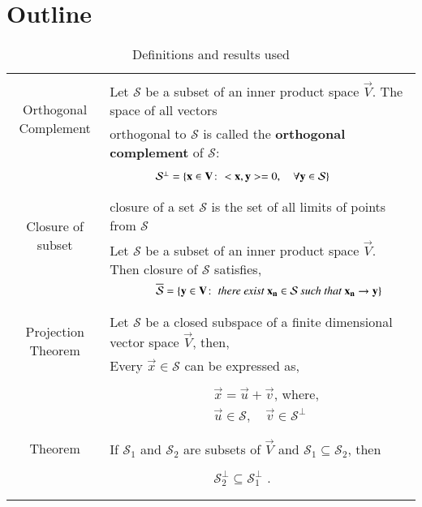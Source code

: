 \documentclass[journal,12pt]{IEEEtran}
\begin{document}
\section{\textbf{Outline}}
\renewcommand{\thetable}{1}
\begin{longtable}{|c|l|}
    \hline
	\multirow{3}{*}{Orthogonal Complement} 
	& \\
	& Let $\mathcal{S}$ be a subset of an inner product space $\vec{V}$. The space of all vectors\\
	&orthogonal to $\mathcal{S}$ is called the \textbf{orthogonal complement} of $\mathcal{S}$:\\
	&\\
	&$\qquad\qquad\mathcal{S}^{\perp}=\left\{\mathbf{x}\in\mathbf{V}\colon<\mathbf{x},\mathbf{y}>=0,\quad\forall \mathbf{y}\in\mathcal{S}\right\}$\\
	&\\
	\hline
	\multirow{3}{*}{Closure of subset} 
	& \\
	& closure of a set $\mathcal{S}$ is the set of all limits of points from $\mathcal{S}$\\
	& Let $\mathcal{S}$ be a subset of an inner product space $\vec{V}$. Then closure of $\mathcal{S}$ satisfies,\\
	&$\qquad\qquad\overline{\mathcal{S}}=\left\{\mathbf{y}\in\mathbf{V}\colon \textit{ there exist } \mathbf{x_n}\in\mathcal{S}\textit{ such that } \mathbf{x_n}\rightarrow \mathbf{y}\right\}$\\
	&\\
	\hline
	\multirow{3}{*}{Projection Theorem} 
	& \\
	&  Let $\mathcal{S}$ be a closed subspace of a finite dimensional vector space $\vec{V}$, then,\\
	&Every $\vec{x}\in \mathcal{S}$ can be expressed as,\\
	&\\
	&$\qquad\qquad\qquad\qquad \vec{x} = \vec{u} + \vec{v}$, where,\\
	&$\qquad\qquad\qquad\qquad \vec{u}\in \mathcal{S},\quad \vec{v} \in \mathcal{S}^{\perp}$\\
	&\\
	\hline
	\multirow{3}{*}{Theorem} 
	& \\
	& If $\mathcal{S}_1$ and $\mathcal{S}_2$ are subsets of $\vec{V}$ and $\mathcal{S}_1\subseteq \mathcal{S}_2$, then\\
	&\\
	&$\qquad\qquad\qquad\qquad\mathcal{S}_{2}^{\perp}\subseteq\mathcal{S}_{1}^{\perp}$
.\\
	&\\
	\hline
    \caption{Definitions and results used}
    \label{table:1}
\end{longtable}
\end{document}

